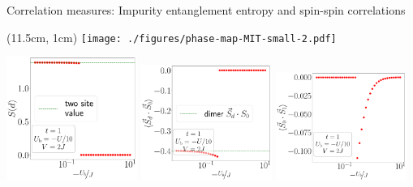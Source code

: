 \documentclass[aspectratio=169]{beamer}
\begin{document}
\begin{frame}[noframenumbering]{Correlation measures: Impurity entanglement entropy and spin-spin correlations}
\begin{textblock*}{0.3\textwidth}(11.5cm, 1cm)
	\texttt{[image: ./figures/phase-map-MIT-small-2.pdf]}
\end{textblock*}
\vspace*{60pt}
	\includegraphics[width=0.32\textwidth]{./figures/EE-d-t=1.000,J=10.000,0.000,40,V=3J,Ubath=-U_by_10,N=4,U=1.000,1000.000,40.pdf}
	\includegraphics[width=0.32\textwidth]{./figures/corr-d0-t=1.000,J=10.000,0.000,40,V=3J,Ubath=-U_by_10,N=4,U=1.000,1000.000,40.pdf}
	\includegraphics[width=0.32\textwidth]{./figures/r-vec-corr-01-t=1.000,J=10.000,0.000,40,V=3J,Ubath=-U_by_10,N=4,U=1.000,1000.000,40.pdf}
\end{frame}
\end{document}
